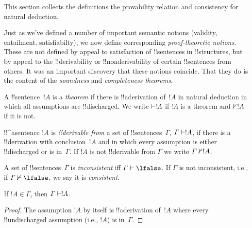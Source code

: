 \documentclass[../../../include/open-logic-section]{subfiles}
\begin{document}
      {}
      {}


\begin{editorial}
This section collects the definitions the provability relation
and consistency for natural deduction.
\end{editorial}

\begin{explain}
Just as we've defined a number of important semantic notions
(validity, entailment, satisfiabilty), we now define corresponding
\emph{proof-theoretic notions}.  These are not defined by appeal to
satisfaction of !!{sentence}s in !!{structure}s, but by appeal to the
!!{derivability} or !!{nonderivability} of certain !!{sentence}s from
others.  It was an important discovery that these notions coincide.
That they do is the content of the \emph{soundness} and
\emph{completeness theorems}.
\end{explain}


\begin{defn}[Theorems]
A !!{sentence}~$!A$ is a \emph{theorem} if there is !!a{derivation}
of~$!A$ in natural deduction in which all assumptions are
!!{discharged}.  We write $\Proves !A$ if $!A$ is a theorem and
$\Proves/ !A$ if it is not.
\end{defn}

\begin{defn}[!!^{derivability}]
!!^a{sentence} $!A$ is \emph{!!{derivable} from} a set of
!!{sentence}s~$\Gamma$, $\Gamma \Proves !A$, if there is a
!!{derivation} with conclusion~$!A$ and in which every assumption
is either !!{discharged} or is in~$\Gamma$. If $!A$ is not
!!{derivable} from $\Gamma$ we write $\Gamma \Proves/ !A$.
\end{defn}

\begin{defn}[Consistency]
A set of !!{sentence}s~$\Gamma$ is \emph{inconsistent} iff $\Gamma
\Proves \lfalse$.  If $\Gamma$ is not inconsistent, i.e., if
$\Gamma \Proves/ \lfalse$, we say it is \emph{consistent}.
\end{defn}

\begin{prop}[Reflexivity]
If $!A \in \Gamma$, then $\Gamma \Proves !A$.
\end{prop}

\begin{proof}
The assumption $!A$ by itself is !!a{derivation} of~$!A$ where every
!!{undischarged} assumption (i.e., $!A$) is in~$\Gamma$.
\end{proof}
  
\end{document}
